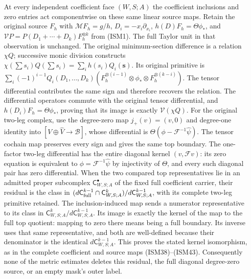 At every independent coefficient face $(W,S;A)$ the coefficient
inclusions and zero entries act componentwise on these same linear source maps.
Retain the original source $F_h$ with $\mathcal M F_h=g/h$,
$D_i=-x_i\partial_{x_i}$, $h(D)F_h=\Theta\phi_*$, and
$\mathcal V P=P(D_1+\cdots+D_k)F_h^{\otimes k}$ from (ISM1).
The full Taylor unit in that observation is unchanged.
The original minimum-section difference is a relation $\chi Q$;
successive monic division constructs
$\chi(\sum s_i)Q(\sum s_i)=\sum_i h(s_i)Q_i(\mathbf s)$.
Its original primitive is
$\sum_i(-1)^{i-1}Q_i(D_1,\ldots,D_k)
 (F_h^{\otimes(i-1)}\otimes\phi_*\otimes F_h^{\otimes(k-i)})$.
The tensor differential contributes the same sign and therefore
recovers the relation. The differential operators commute with the original tensor
differential, and $h(D_i)F_h=\Theta\phi_*$, proving that its image
is exactly $\mathcal V(\chi Q)$. For the original two-leg complex,
use the degree-zero map $j_+(v)=(v,0)$ and degree-one identity into
$[V\oplus\widehat V\to\mathscr B]$, whose differential is
$\Theta(\phi-\mathcal F^{-1}\widehat\psi)$.
The tensor cochain map preserves every sign and gives the same top
boundary. The one-factor two-leg differential has the entire diagonal kernel
$(v,\mathcal Fv)$: its zero equation is equivalent to
$\phi=\mathcal F^{-1}\widehat\psi$ by injectivity of $\Theta$,
and every such diagonal pair has zero differential.
When the two compared top representatives lie in an admitted
proper subcomplex $\mathsf C_{W,S;A}^\bullet$ of the fixed full
coefficient carrier, their residual is
the class in
$(d\mathsf C_{\rm full}^{k-1}\cap\mathsf C_{W,S;A}^k)/
d\mathsf C_{W,S;A}^{k-1}$, with its complete two-leg primitive retained. The inclusion-induced
map sends a numerator representative to its class in
$\mathsf C_{W,S;A}^k/d\mathsf C_{W,S;A}^{k-1}$. Its image is exactly
the kernel of the map to the full top quotient: mapping to zero there
means being a full boundary. Its inverse uses that same representative,
and both are well-defined because their denominator is the identical
$d\mathsf C_{W,S;A}^{k-1}$. This proves the stated kernel isomorphism,
as in the complete coefficient and source maps (ISM38)--(ISM43).
Consequently none of the metric estimates deletes this residual,
the full diagonal degree-zero source, or an empty mask's outer label.

